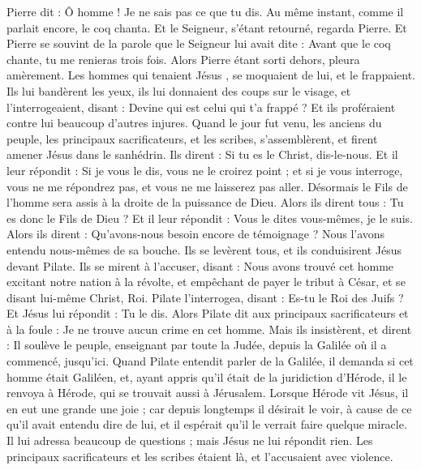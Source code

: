 \begin{multicols}{2}
Pierre dit : Ô homme ! Je ne sais pas ce que tu dis. Au même instant, comme il parlait encore, le coq chanta.
Et le Seigneur, s’étant retourné, regarda Pierre. Et Pierre se souvint de la parole que le Seigneur lui avait dite : Avant que le coq chante, tu me renieras trois fois.
Alors Pierre étant sorti dehors, pleura amèrement.
Les hommes qui tenaient Jésus , se moquaient de lui, et le frappaient.
Ils lui bandèrent les yeux, ils lui donnaient des coups sur le visage, et l'interrogeaient, disant : Devine qui est celui qui t'a frappé ?
Et ils proféraient contre lui beaucoup d’autres injures.
Quand le jour fut venu, les anciens du peuple, les principaux sacrificateurs, et les scribes, s'assemblèrent, et firent amener Jésus dans le sanhédrin.
Ils dirent : Si tu es le Christ, dis-le-nous. Et il leur répondit : Si je vous le dis, vous ne le croirez point ;
et si je vous interroge, vous ne me répondrez pas, et vous ne me laisserez pas aller.
Désormais le Fils de l'homme sera assis à la droite de la puissance de Dieu.
Alors ils dirent tous : Tu es donc le Fils de Dieu ? Et il leur répondit : Vous le dites vous-mêmes, je le suis.
Alors ils dirent : Qu'avons-nous besoin encore de témoignage ? Nous l'avons entendu nous-mêmes de sa bouche.
\VerseOne{}Ils se levèrent tous, et ils conduisirent Jésus devant Pilate.
Ils se mirent à l'accuser, disant : Nous avons trouvé cet homme excitant notre nation à la révolte, et empêchant de payer le tribut à César, et se disant lui-même Christ, Roi.
Pilate l'interrogea, disant : Es-tu le Roi des Juifs ? Et Jésus lui répondit : Tu le dis.
Alors Pilate dit aux principaux sacrificateurs et à la foule : Je ne trouve aucun crime en cet homme.
Mais ils insistèrent, et dirent : Il soulève le peuple, enseignant par toute la Judée, depuis la Galilée où il a commencé, jusqu’ici.
Quand Pilate entendit parler de la Galilée, il demanda si cet homme était Galiléen,
et, ayant appris qu'il était de la juridiction d'Hérode, il le renvoya à Hérode, qui se trouvait aussi à Jérusalem.
Lorsque Hérode vit Jésus, il en eut une grande une joie ; car depuis longtemps il désirait le voir, à cause de ce qu’il avait entendu dire de lui, et il espérait qu'il le verrait faire quelque miracle.
Il lui adressa beaucoup de questions ; mais Jésus ne lui répondit rien.
Les principaux sacrificateurs et les scribes étaient là, et l’accusaient avec violence.

\end{multicols}
